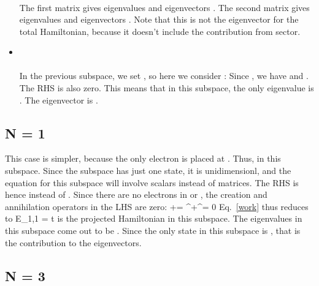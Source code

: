 \documentclass[12pt]{article}
\begin{document}
\begin{itemize}
\begin{gather}
\end{gather}
The first matrix gives eigenvalues  and eigenvectors . The second matrix gives eigenvalues  and eigenvectors . Note that this is not the eigenvector for the total Hamiltonian, because it doesn't include the contribution from  sector.
\item {} \\\\
In the previous subspace, we set , so here we consider :
Since , we have  and . The RHS is also zero. This means that in this subspace, the only eigenvalue is . The eigenvector is \il{\ket{\ua,\ua}}.
\end{itemize}

\subsection{N = 1}
This case is simpler, because the only electron is placed at \il{\na}. Thus,  in this subspace. Since the subspace has just one state, it is unidimensionl, and the equation for this subspace will involve scalars instead of matrices. The RHS is hence  instead of . Since there are no electrons in \il{\nb} or \il{\nd}, the creation and annihilation operators in the LHS are zero:
\beq
\na\nb+\nc\nd = \cb^\dagger\ce+\ce^\dagger\cb = 0
\eeq
Eq.~\ref{work} thus reduces to
\beq[En1]
\hat E_{1\ua,1} = \pm t
\eeq
{} is the projected Hamiltonian in this subspace. The eigenvalues in this subspace come out to be . Since the only state in this subspace is , that is the contribution to the eigenvectors.

\subsection{N = 3}
\end{document}
